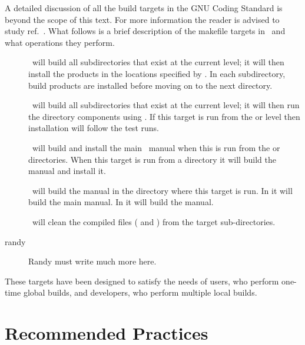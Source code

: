 A detailed discussion of all the build targets in the GNU Coding
Standard is beyond the scope of this text. For more information the
reader is advised to study ref.~\cite{gnu}.  What follows is a brief
description of the makefile targets in \draco\ and what operations
they perform.
\begin{description}
\item[] \gmake\ will
  build all subdirectories that exist at the current level; it will
  then install the products in the locations specified by
  .  In each subdirectory, build products are installed
  before moving on to the next directory.
\item[] \gmake\ will
  build all subdirectories that exist at the current level; it will
  then run the  directory components using \dejagnu.  If
  this target is run from the  or  level
  then installation will follow the test runs.
\item[]
  \gmake\ will build and install the main \draco\ manual when this is
  run from the  or  directories.  When
  this target is run from a  directory
  it will build the  manual and install it.
\item[] \gmake\ will build
  the manual in the directory where this target is run.  In
   it will build the main manual.  In
   it will build the 
  manual.
\item[] \gmake\ will
  clean the compiled files ( and ) from the target
  sub-directories.
\item[randy] Randy must write much more here.
\end{description}
These targets have been designed to satisfy the needs of users, who
perform one-time global builds, and developers, who perform multiple
local builds.


\section{Recommended Practices}

